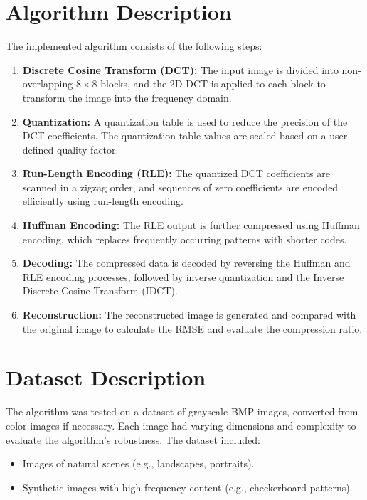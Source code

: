 \documentclass[12pt,a4paper]{article}
\begin{document}
\section{Algorithm Description}
The implemented algorithm consists of the following steps:
\begin{enumerate}
    \item \textbf{Discrete Cosine Transform (DCT):} 
    The input image is divided into non-overlapping $8 \times 8$ blocks, and the 2D DCT is applied to each block to transform the image into the frequency domain.
    
    \item \textbf{Quantization:}
    A quantization table is used to reduce the precision of the DCT coefficients. The quantization table values are scaled based on a user-defined quality factor.
    
    \item \textbf{Run-Length Encoding (RLE):}
    The quantized DCT coefficients are scanned in a zigzag order, and sequences of zero coefficients are encoded efficiently using run-length encoding.
    
    \item \textbf{Huffman Encoding:}
    The RLE output is further compressed using Huffman encoding, which replaces frequently occurring patterns with shorter codes.
    
    \item \textbf{Decoding:}
    The compressed data is decoded by reversing the Huffman and RLE encoding processes, followed by inverse quantization and the Inverse Discrete Cosine Transform (IDCT).
    
    \item \textbf{Reconstruction:}
    The reconstructed image is generated and compared with the original image to calculate the RMSE and evaluate the compression ratio.
\end{enumerate}

\section{Dataset Description}
The algorithm was tested on a dataset of grayscale BMP images, converted from color images if necessary. Each image had varying dimensions and complexity to evaluate the algorithm's robustness. The dataset included:
\begin{itemize}
    \item Images of natural scenes (e.g., landscapes, portraits).
    \item Synthetic images with high-frequency content (e.g., checkerboard patterns).
\end{itemize}
\end{document}
